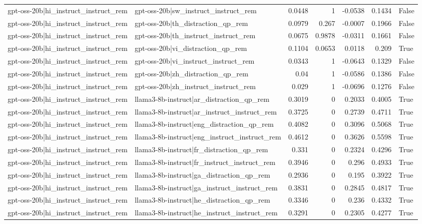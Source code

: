 \begin{table}
\begin{tabular}{l l r r r r l}
gpt-oss-20b|hi_instruct_instruct_rem & gpt-oss-20b|sw_instruct_instruct_rem & 0.0448 & 1 & -0.0538 & 0.1434 & False \\
gpt-oss-20b|hi_instruct_instruct_rem & gpt-oss-20b|th_distraction_qp_rem & 0.0979 & 0.267 & -0.0007 & 0.1966 & False \\
gpt-oss-20b|hi_instruct_instruct_rem & gpt-oss-20b|th_instruct_instruct_rem & 0.0675 & 0.9878 & -0.0311 & 0.1661 & False \\
gpt-oss-20b|hi_instruct_instruct_rem & gpt-oss-20b|vi_distraction_qp_rem & 0.1104 & 0.0653 & 0.0118 & 0.209 & True \\
gpt-oss-20b|hi_instruct_instruct_rem & gpt-oss-20b|vi_instruct_instruct_rem & 0.0343 & 1 & -0.0643 & 0.1329 & False \\
gpt-oss-20b|hi_instruct_instruct_rem & gpt-oss-20b|zh_distraction_qp_rem & 0.04 & 1 & -0.0586 & 0.1386 & False \\
gpt-oss-20b|hi_instruct_instruct_rem & gpt-oss-20b|zh_instruct_instruct_rem & 0.029 & 1 & -0.0696 & 0.1276 & False \\
gpt-oss-20b|hi_instruct_instruct_rem & llama3-8b-instruct|ar_distraction_qp_rem & 0.3019 & 0 & 0.2033 & 0.4005 & True \\
gpt-oss-20b|hi_instruct_instruct_rem & llama3-8b-instruct|ar_instruct_instruct_rem & 0.3725 & 0 & 0.2739 & 0.4711 & True \\
gpt-oss-20b|hi_instruct_instruct_rem & llama3-8b-instruct|eng_distraction_qp_rem & 0.4082 & 0 & 0.3096 & 0.5068 & True \\
gpt-oss-20b|hi_instruct_instruct_rem & llama3-8b-instruct|eng_instruct_instruct_rem & 0.4612 & 0 & 0.3626 & 0.5598 & True \\
gpt-oss-20b|hi_instruct_instruct_rem & llama3-8b-instruct|fr_distraction_qp_rem & 0.331 & 0 & 0.2324 & 0.4296 & True \\
gpt-oss-20b|hi_instruct_instruct_rem & llama3-8b-instruct|fr_instruct_instruct_rem & 0.3946 & 0 & 0.296 & 0.4933 & True \\
gpt-oss-20b|hi_instruct_instruct_rem & llama3-8b-instruct|ga_distraction_qp_rem & 0.2936 & 0 & 0.195 & 0.3922 & True \\
gpt-oss-20b|hi_instruct_instruct_rem & llama3-8b-instruct|ga_instruct_instruct_rem & 0.3831 & 0 & 0.2845 & 0.4817 & True \\
gpt-oss-20b|hi_instruct_instruct_rem & llama3-8b-instruct|he_distraction_qp_rem & 0.3346 & 0 & 0.236 & 0.4332 & True \\
gpt-oss-20b|hi_instruct_instruct_rem & llama3-8b-instruct|he_instruct_instruct_rem & 0.3291 & 0 & 0.2305 & 0.4277 & True \\

\end{tabular}
\end{table}
